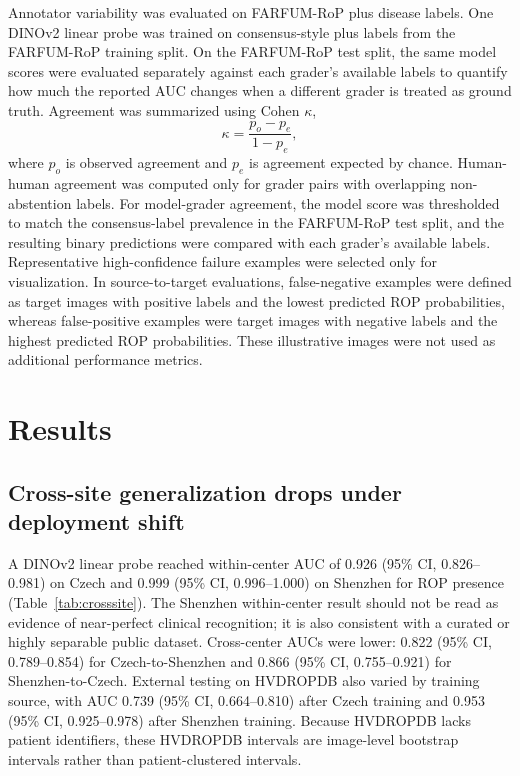 \documentclass[pdflatex,sn-vancouver,Numbered,iicol]{sn-jnl}
\begin{document}
Annotator variability was evaluated on FARFUM-RoP plus disease labels. One DINOv2
linear probe was trained on consensus-style plus labels from the FARFUM-RoP
training split. On the FARFUM-RoP test split, the same model scores were evaluated
separately against each grader's available labels to quantify how much the
reported AUC changes when a different grader is treated as ground truth. Agreement
was summarized using Cohen $\kappa$,
\[
\kappa=\frac{p_o-p_e}{1-p_e},
\]
where \(p_o\) is observed agreement and \(p_e\) is agreement expected by chance.
Human-human agreement was computed only for
grader pairs with overlapping non-abstention labels. For model-grader agreement,
the model score was thresholded to match the consensus-label prevalence in the
FARFUM-RoP test split, and the resulting binary predictions were compared with
each grader's available labels.
Representative high-confidence failure examples were selected only for
visualization. In source-to-target evaluations, false-negative examples were
defined as target images with positive labels and the lowest predicted ROP
probabilities, whereas false-positive examples were target images with negative
labels and the highest predicted ROP probabilities. These illustrative images were
not used as additional performance metrics.

\section{Results}\label{sec:results}

\subsection{Cross-site generalization drops under deployment shift}\label{sec:r-crosssite}
A DINOv2 linear probe reached within-center AUC of 0.926 (95\% CI,
0.826--0.981) on Czech and 0.999 (95\% CI, 0.996--1.000) on Shenzhen for ROP
presence (Table~\ref{tab:crosssite}). The Shenzhen within-center result should
not be read as evidence of near-perfect clinical recognition; it is also
consistent with a curated or highly separable public dataset. Cross-center AUCs
were lower: 0.822 (95\% CI, 0.789--0.854) for Czech-to-Shenzhen and 0.866
(95\% CI, 0.755--0.921) for Shenzhen-to-Czech. External testing on HVDROPDB also
varied by training source, with AUC 0.739 (95\% CI, 0.664--0.810) after Czech
training and 0.953 (95\% CI, 0.925--0.978) after Shenzhen training. Because
HVDROPDB lacks patient identifiers, these HVDROPDB intervals are image-level
bootstrap intervals rather than patient-clustered intervals.
\end{document}
